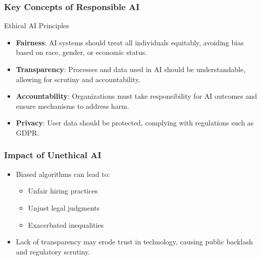 \documentclass[aspectratio=169]{beamer}
\begin{document}
\begin{frame}[fragile]
    \frametitle{Key Concepts of Responsible AI}
    
    \begin{block}{Ethical AI Principles}
        \begin{itemize}
            \item \textbf{Fairness}: AI systems should treat all individuals equitably, avoiding bias based on race, gender, or economic status.
            \item \textbf{Transparency}: Processes and data used in AI should be understandable, allowing for scrutiny and accountability.
            \item \textbf{Accountability}: Organizations must take responsibility for AI outcomes and ensure mechanisms to address harm.
            \item \textbf{Privacy}: User data should be protected, complying with regulations such as GDPR.
        \end{itemize}
    \end{block}
\end{frame}

\begin{frame}[fragile]
    \frametitle{Impact of Unethical AI}
    
    \begin{itemize}
        \item Biased algorithms can lead to:
            \begin{itemize}
                \item Unfair hiring practices
                \item Unjust legal judgments
                \item Exacerbated inequalities
            \end{itemize}
        \item Lack of transparency may erode trust in technology, causing public backlash and regulatory scrutiny.
    \end{itemize}
\end{frame}
\end{document}
